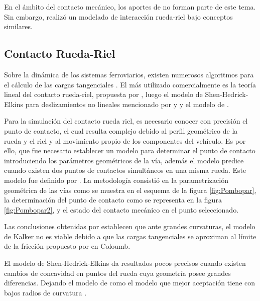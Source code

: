 \documentclass[main]{subfiles}
\begin{document}
	 En el ámbito del contacto mecánico, los aportes de \citet{Patrikar2004213} no forman parte de este tema. Sin embargo, \citet{Kalker1990} realizó un modelado de interacción rueda-riel bajo conceptos similares.
  
  
\subsection{Contacto Rueda-Riel}  
  
	Sobre la dinámica de los sistemas ferroviarios, existen numerosos algoritmos para el cálculo de las cargas tangenciales \citet{Kalker1991243}. El más utilizado comercialmente es la teoría lineal del contacto rueda-riel, propuesta por \citet{Kalker1971VSD}, luego el modelo de Shen-Hedrick-Elkins para deslizamientos no lineales mencionado por \citet{Kalker1991243} y \citet{springerlink:10.1007/s11044-007-9094-y} y el modelo de \citet{Polach1999}.

Para la simulación del contacto rueda riel, es necesario conocer con precisión el punto de contacto, el cual resulta complejo debido al perfil geométrico de la rueda y el riel y al movimiento propio de los componentes del vehículo. Es por ello, que fue necesario establecer un modelo para determinar el punto de contacto introduciendo los parámetros geométricos de la vía, además el modelo predice cuando existen dos puntos de contactos simultáneos en una misma rueda. Este modelo fue definido por \citet{springerlink:10.1007/s11044-007-9094-y}. La metodología  consistió en la parametrización geométrica de las vías como se muestra en el esquema de la figura \ref{fig:Pombopar}, la determinación del punto de contacto como se representa en la figura \ref{fig:Pombopar2}, y el estado del contacto mecánico en el punto seleccionado.

	Las conclusiones obtenidas por \citet{springerlink:10.1007/s11044-007-9094-y} establecen que ante grandes curvaturas, el modelo de Kalker no es viable debido a que las cargas tangenciales se aproximan al límite de la fricción propuesto por en Coloumb. 

	El modelo de Shen-Hedrick-Elkins da resultados pocos precisos cuando existen cambios de concavidad en puntos del rueda cuya geometría posee grandes diferencias. Dejando el modelo de \citet{Polach1999} como el modelo que mejor aceptación tiene con bajos radios de curvatura \citet{springerlink:10.1007/s11044-007-9094-y}.
\end{document}
